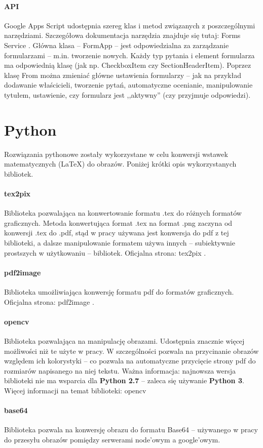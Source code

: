 \paragraph{API}
Google Apps Script udostępnia szereg klas i metod związanych z poszczególnymi narzędziami. Szczegółowa dokumentacja narzędzia znajduje się tutaj: Forms Service \cite{FormsService}.
 Główna klasa -- FormApp -- jest odpowiedzialna za zarządzanie formularzami -- m.in. tworzenie nowych. Każdy typ pytania i element formularza ma odpowiednią klasę (jak np. CheckboxItem czy SectionHeaderItem). Poprzez klasę From  można zmieniać główne ustawienia formularzy  -- jak na przykład dodawanie właścicieli, tworzenie pytań, automatyczne ocenianie, manipulowanie tytułem, ustawienie, czy formularz jest ,,aktywny'' (czy przyjmuje odpowiedzi).
 
 
\section{Python}
Rozwiązania pythonowe zostały wykorzystane w celu konwersji wstawek matematycznych (\LaTeX{}) do obrazów. Poniżej krótki opis wykorzystanych bibliotek.
\paragraph{tex2pix} Biblioteka pozwalająca na konwertowanie formatu .tex do różnych formatów graficznych. Metoda konwertująca format .tex na format .png zaczyna od konwersji .tex do .pdf, stąd w pracy używana jest konwersja do pdf z tej biblioteki, a dalsze manipulowanie formatem używa innych -- subiektywnie prostszych w użytkowaniu -- bibliotek. 
\ind Oficjalna strona: tex2pix \cite{tex2pix}.

\paragraph{pdf2image} Biblioteka  umożliwiająca konwersję formatu pdf do formatów graficznych.
\ind Oficjalna strona: pdf2image \cite{pdf2image}.
\paragraph{opencv} Biblioteka pozwalająca na manipulację obrazami. Udostępnia znacznie więcej możliwości niż te użyte w pracy. W szczególności pozwala na przycinanie obrazów względem ich kolorystyki -- co pozwala na automatyczne przycięcie strony pdf do rozmiarów napisanego na niej tekstu. Ważna informacja: najnowsza wersja biblioteki nie ma wsparcia dla \textbf{Python 2.7} -- zaleca się używanie \textbf{Python 3}. Więcej informacji na temat biblioteki: opencv \cite{opencv}
\paragraph{base64} Biblioteka pozwala na konwersję obrazu do formatu Base64 -- używanego w pracy do przesyłu obrazów pomiędzy serwerami node'owym a google'owym. 




